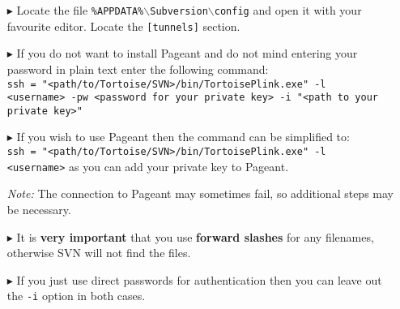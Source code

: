 \begin{enumerate}
  \item[$\blacktriangleright$] Locate the file \texttt{\%APPDATA\%$\backslash$Subversion$\backslash$config} and open it with your favourite editor. Locate the
  \texttt{[tunnels]} section.
  
  \item[$\blacktriangleright$] If you do not want to install Pageant and do not mind entering your password in plain text enter the following command:\\
  \texttt{ssh = "<path/to/Tortoise/SVN>/bin/TortoisePlink.exe" -l \\<username> -pw <password for your private key> -i "<path to your private key>"}
    
  \item[$\blacktriangleright$] If you wish to use Pageant then the command can be simplified to:\\ \texttt{ssh = "<path/to/Tortoise/SVN>/bin/TortoisePlink.exe"
  -l \\<username>} as you can add your private key to Pageant.

	\textit{Note:} The connection to Pageant may sometimes fail, so additional steps may be necessary.


  \item[$\blacktriangleright$] It is \textbf{very important} that you use \textbf{forward slashes} for any filenames, otherwise SVN will not find the files.

  \item[$\blacktriangleright$] If you just use direct passwords for authentication then you can leave out the \texttt{-i} option in both cases.
\end{enumerate}
